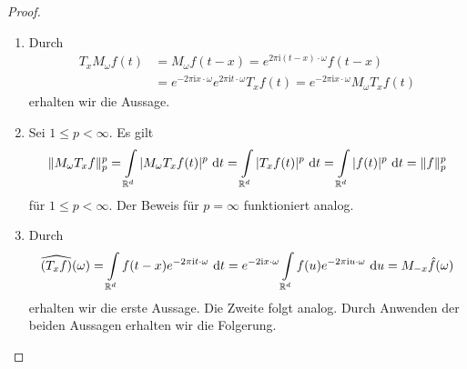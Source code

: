 \begin{proof}
	\begin{enumerate}[label =\textbf{(\roman*)}] 
		\item
		Durch
		\begin{align*}
		T_x M_\omega f(t) 
		&= M_\omega f(t-x)
		= e^{2\pi \mathrm{i} (t-x) \cdot \omega} f(t-x)\\
		&= e^{-2\pi \mathrm{i} x \cdot \omega} e^{2\pi \mathrm{i} t \cdot \omega} T_x f(t)
		= e^{-2\pi \mathrm{i} x \cdot \omega} M_\omega T_x f(t)
		\end{align*}
		erhalten wir die Aussage.
		
		\item
		Sei $1\leq p < \infty$.
		Es gilt
		\begin{align*}
		\| M_\omega T_x f\|_p^p
		=
		\int \limits_{\mathbb{R}^d} | M_\omega T_x f(t) |^p \text{ d} t
		=
		\int \limits_{\mathbb{R}^d} | T_x f(t) |^p \text{ d} t
		=
		\int \limits_{\mathbb{R}^d} | f(t) |^p \text{ d} t
		=
		\|  f\|_p^p
		\end{align*}
		für $1\leq p < \infty$.
		Der Beweis für $p = \infty$ funktioniert analog.
		
		\item
		Durch
		\begin{align*}
		\widehat{(T_x f)} (\omega) 
		=
		\int \limits_{\mathbb{R}^d} f(t-x) e^{-2 \pi \mathrm{i } t \cdot \omega} \text{ d} t
		=
		e^{-2 \textrm{i} x\cdot \omega}
		\int \limits_{\mathbb{R}^d} f(u) e^{-2 \pi \mathrm{i} u \cdot \omega} \text{ d} u
		= M_{-x} \hat{f}(\omega)
		\end{align*}
		erhalten wir die erste Aussage.
		Die Zweite folgt analog.
		Durch Anwenden der beiden Aussagen
		erhalten wir die Folgerung.
	\end{enumerate}
\end{proof}


